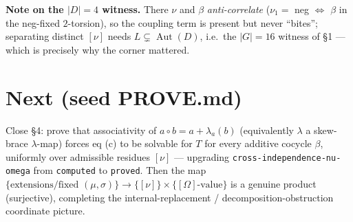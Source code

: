 \documentclass[11pt]{article}
\newcommand{\Aut}{\operatorname{Aut}}
\newcommand{\nubr}{[\nu]}
\newcommand{\Om}{[\Omega]}
\begin{document}
\medskip\noindent\textbf{Note on the $|D|=4$ witness.} There $\nu$ and $\beta$
\emph{anti-correlate} ($\nu_1=$ neg $\Leftrightarrow$ $\beta$ in the neg-fixed $2$-torsion), so
the coupling term is present but never ``bites''; separating distinct $\nubr$ needs
$L\subsetneq\Aut(D)$, i.e.\ the $|G|=16$ witness of \S1 --- which is precisely why the corner
mattered.

\section{Next (seed PROVE.md)}
Close \S4: prove that associativity of $a\circ b=a+\lambda_a(b)$ (equivalently $\lambda$ a
skew-brace $\lambda$-map) forces eq (c) to be solvable for $T$ for every additive cocycle
$\beta$, uniformly over admissible residues $\nubr$ --- upgrading
\texttt{cross-independence-nu-omega} from \texttt{computed} to \texttt{proved}. Then the map
$\{\text{extensions/fixed }(\mu,\sigma)\}\to\{\nubr\}\times\{\Om\text{-value}\}$ is a genuine
product (surjective), completing the internal-replacement / decomposition-obstruction
coordinate picture.
\end{document}

